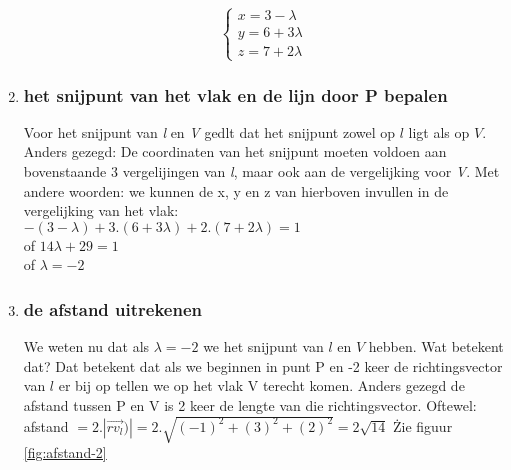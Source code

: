 \documentclass[hidelinks, a4wide, 12pt,  twoside]{book}
\begin{document}
\begin{enumerate}[label=(\alph*)]
\[\begin{cases}
x =  3 -\lambda \\
y =  6 + 3\lambda\\
z = 7 + 2\lambda
\end{cases}
\] 
\item \subsubsection{het snijpunt van  het  vlak en de lijn door P bepalen}
Voor het snijpunt van\textit{ l} en \textit{V} gedlt dat het snijpunt zowel op $  l $ ligt als op $ V $. Anders gezegd: De coordinaten  van het snijpunt moeten voldoen aan bovenstaande 3 vergelijingen van\textit{ l}, maar ook aan de vergelijking voor \textit{V}. Met andere woorden: we kunnen de x, y en z van hierboven invullen in de vergelijking van het vlak:\\
$ -(3 -\lambda) + 3.(6 + 3\lambda) + 2.(7 + 2\lambda) = 1$ \\
of $ 14\lambda + 29 = 1 $ \\of $  \lambda = -2 $

\item \subsubsection{de afstand uitrekenen}
We weten nu dat als $  \lambda = -2 $ we het snijpunt van $ l  $ en $ V $ hebben. Wat betekent dat? Dat betekent dat als we beginnen in punt P en -2 keer de richtingsvector van $  l $ er bij op tellen we op het vlak V terecht komen.
Anders gezegd de afstand tussen P en V is 2 keer de lengte van die richtingsvector. Oftewel: 
afstand $ = 2. |\overrightarrow{rv_{l}})| = 2. \sqrt{(-1)^{2} + (3)^{2} + (2)^{2} } = 2\sqrt{14} $ \. Zie  figuur  \ref{fig:afstand-2}
\end{enumerate}	

\end{document}
